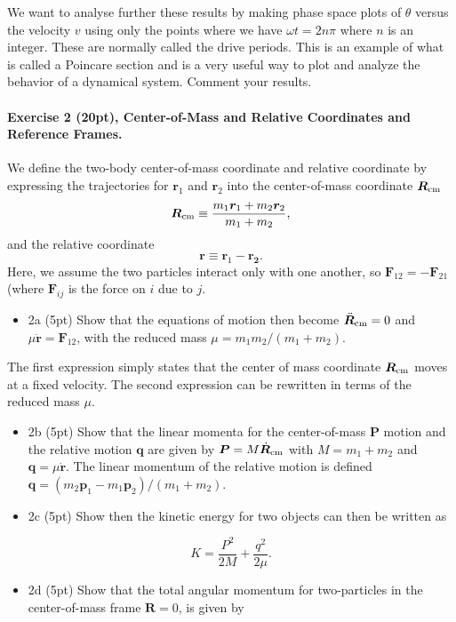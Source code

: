 \documentclass[%
oneside,                 %
final,                   %
10pt]{article}
\begin{document}
\noindent
We want to analyse further these results by making phase space plots
of $\theta$ versus the velocity $v$ using only the points where we
have $\omega t=2n\pi$ where $n$ is an integer. These are normally
called the drive periods.  This is an example of what is called a
Poincare section and is a very useful way to plot and analyze the
behavior of a dynamical system. Comment your results.

\paragraph{Exercise 2 (20pt), Center-of-Mass and Relative Coordinates and Reference Frames.}
We define the two-body center-of-mass coordinate and relative coordinate by expressing the trajectories for
$\bm{r}_1$ and $\bm{r}_2$ into the center-of-mass coordinate
$\bm{R}_{\rm cm}$ 
\[
\bm{R}_{\rm cm}\equiv\frac{m_1\bm{r}_1+m_2\bm{r}_2}{m_1+m_2},
\]
and the relative coordinate 
\[
\bm{r}\equiv\bm{r}_1-\bm{r_2}.
\]
Here, we assume the two particles interact only with one another, so $\bm{F}_{12}=-\bm{F}_{21}$ (where $\bm{F}_{ij}$ is the force on $i$ due to $j$.

\begin{itemize}
\item 2a (5pt) Show that the equations of motion then become $\ddot{\bm{R}}_{\rm cm}=0$ and $\mu\ddot{\bm{r}}=\bm{F}_{12}$, with the reduced mass $\mu=m_1m_2/(m_1+m_2)$.
\end{itemize}

\noindent
The first expression simply states that the center of mass coordinate $\bm{R}_{\rm cm}$ moves at a fixed velocity. The second expression can be rewritten in terms of the reduced mass $\mu$.

\begin{itemize}
\item 2b (5pt) Show that the linear momenta for the center-of-mass $\bm{P}$ motion and the relative motion $\bm{q}$ are given by $\bm{P}=M\dot{\bm{R}}_{\rm cm}$ with $M=m_1+m_2$ and $\bm{q}=\mu\dot{\bm{r}}$.  The linear momentum of the relative motion is defined $\bm{q} = (m_2\bm{p}_1-m_1\bm{p}_2)/(m_1+m_2)$.

\item 2c (5pt) Show then the kinetic energy for two objects can then be written as
\end{itemize}

\noindent
\[
K=\frac{P^2}{2M}+\frac{q^2}{2\mu}.
\]

\begin{itemize}
\item 2d (5pt) Show that the total angular momentum for two-particles in the center-of-mass frame $\bm{R}=0$, is given by
\end{itemize}
\end{document}
